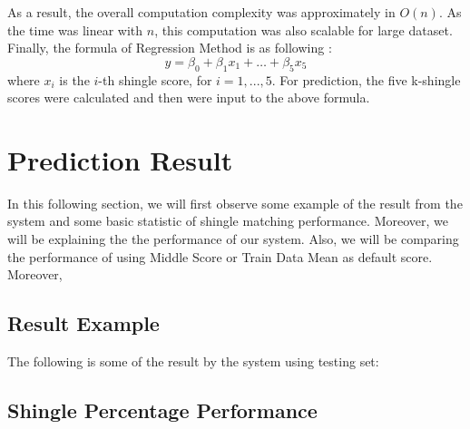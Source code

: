 As a result, the overall computation complexity was approximately in \(O(n)\).
As the time was linear with \(n\), this computation was also scalable for large dataset. Finally, the formula of Regression Method is as following : 
\begin{displaymath}
y = \beta_0  + \beta_1 x_1 + \dots + \beta_5 x_5
\end{displaymath}
where $x_i$ is the $i$-th shingle score, for $i=1,...,5$. For prediction, the five k-shingle scores were calculated and then were input to the above formula.

\section{Prediction Result}
In this following section, we will first observe some example of the result from the system and some basic statistic of shingle matching performance. Moreover, we will be explaining the the performance of our system. Also, we will be comparing the performance of using Middle Score or Train Data Mean as default score. Moreover, 
\subsection{Result Example}
The following is some of the result by the system using testing set:


\subsection{Shingle Percentage Performance}


